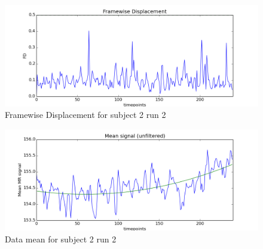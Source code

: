 \begin{figure}[H]
    \centering
        \includegraphics[scale=0.5]{figures/fd_sub2run2.png}
    \caption{Framewise Displacement for subject 2 run 2}
\end{figure}

\begin{figure}[H]
    \centering
        \includegraphics[scale=0.5]{figures/mean_sub2run2.png}
    \caption{Data mean for subject 2 run 2}
\end{figure}



